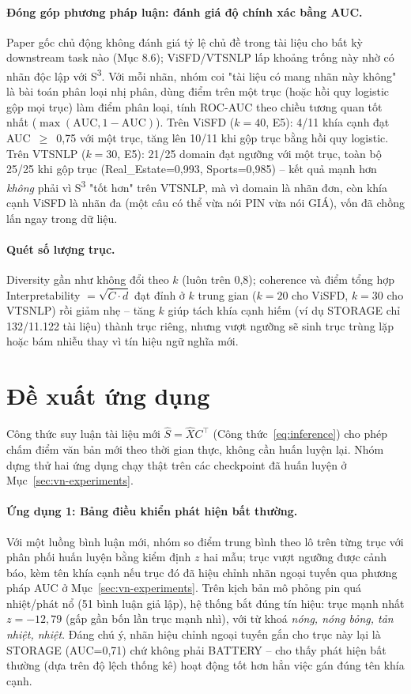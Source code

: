 \documentclass[11pt]{article}
\begin{document}
\paragraph{Đóng góp phương pháp luận: đánh giá độ chính xác bằng AUC.}
Paper gốc chủ động không đánh giá tỷ lệ chủ đề trong tài liệu cho bất kỳ
downstream task nào (Mục 8.6); ViSFD/VTSNLP lấp khoảng trống này nhờ có
nhãn độc lập với S\textsuperscript{3}. Với mỗi nhãn, nhóm coi "tài liệu
có mang nhãn này không" là bài toán phân loại nhị phân, dùng điểm trên
một trục (hoặc hồi quy logistic gộp mọi trục) làm điểm phân loại, tính
ROC-AUC theo chiều tương quan tốt nhất ($\max(\text{AUC},1-\text{AUC})$).
Trên ViSFD ($k=40$, E5): 4/11 khía cạnh đạt AUC~$\geq$~0,75 với một trục,
tăng lên 10/11 khi gộp trục bằng hồi quy logistic. Trên VTSNLP ($k=30$,
E5): 21/25 domain đạt ngưỡng với một trục, toàn bộ 25/25 khi gộp trục
(Real\_Estate=0,993, Sports=0,985) -- kết quả mạnh hơn \emph{không} phải
vì S\textsuperscript{3} "tốt hơn" trên VTSNLP, mà vì domain là nhãn đơn,
còn khía cạnh ViSFD là nhãn đa (một câu có thể vừa nói PIN vừa nói GIÁ),
vốn đã chồng lấn ngay trong dữ liệu.

\paragraph{Quét số lượng trục.} Diversity gần như không đổi theo $k$
(luôn trên 0,8); coherence và điểm tổng hợp Interpretability
$=\sqrt{\bar{C}\cdot d}$ đạt đỉnh ở $k$ trung gian ($k=20$ cho ViSFD,
$k=30$ cho VTSNLP) rồi giảm nhẹ -- tăng $k$ giúp tách khía cạnh hiếm (ví
dụ STORAGE chỉ 132/11.122 tài liệu) thành trục riêng, nhưng vượt ngưỡng
sẽ sinh trục trùng lặp hoặc bám nhiễu thay vì tín hiệu ngữ nghĩa mới.

\section{Đề xuất ứng dụng}
\label{sec:application}

Công thức suy luận tài liệu mới $\hat{S}=\hat{X}C^{\top}$
(Công thức~\ref{eq:inference}) cho phép chấm điểm văn bản mới theo thời
gian thực, không cần huấn luyện lại. Nhóm dựng thử hai ứng dụng chạy
thật trên các checkpoint đã huấn luyện ở Mục~\ref{sec:vn-experiments}.

\paragraph{Ứng dụng 1: Bảng điều khiển phát hiện bất thường.} Với một
luồng bình luận mới, nhóm so điểm trung bình theo lô trên từng trục với
phân phối huấn luyện bằng kiểm định $z$ hai mẫu; trục vượt ngưỡng được
cảnh báo, kèm tên khía cạnh nếu trục đó đã hiệu chỉnh nhãn ngoại tuyến
qua phương pháp AUC ở Mục~\ref{sec:vn-experiments}. Trên kịch bản mô
phỏng pin quá nhiệt/phát nổ (51 bình luận giả lập), hệ thống bắt đúng tín
hiệu: trục mạnh nhất $z=-12{,}79$ (gấp gần bốn lần trục mạnh nhì), với từ
khoá \emph{nóng, nóng bỏng, tản nhiệt, nhiệt}. Đáng chú ý, nhãn hiệu
chỉnh ngoại tuyến gắn cho trục này lại là STORAGE (AUC=0,71) chứ không
phải BATTERY -- cho thấy phát hiện bất thường (dựa trên độ lệch thống kê)
hoạt động tốt hơn hẳn việc gán đúng tên khía cạnh.
\end{document}
